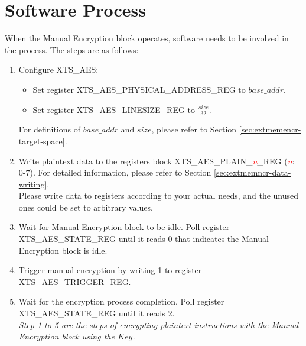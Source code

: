 \documentclass[main\_\_EN.tex]{subfiles}
\begin{document}
\section{ Software Process }

When the Manual Encryption block operates, software needs to be involved in the process. The steps are as follows:

\begin{enumerate}
    
    \item Configure XTS\_AES:
    \begin{itemize}
        \item Set register XTS\_AES\_PHYSICAL\_ADDRESS\_REG to \begin{math}base\_addr\end{math}.
        \item Set register XTS\_AES\_LINESIZE\_REG to \begin{math}\frac{size}{32}\end{math}.
    \end{itemize}
    For definitions of \begin{math} base\_addr\end{math} and \begin{math}size\end{math}, please refer to Section \ref{sec:extmemencr-target-space}.
    \item Write plaintext data to the registers block XTS\_AES\_PLAIN\_\textcolor{red}{\it{n}}\_REG (\textcolor{red}{\it{n}}: 0-7). For detailed information, please refer to Section \ref{sec:extmemncr-data-writing}. \\Please write data to registers according to your actual needs, and the unused ones could be set to arbitrary values.
    
    \item Wait for Manual Encryption block to be idle. Poll register XTS\_AES\_STATE\_REG until it reads 0 that indicates the Manual Encryption block is idle.
    
    \item Trigger manual encryption by writing 1 to register XTS\_AES\_TRIGGER\_REG.
    
    \item Wait for the encryption process completion. Poll register XTS\_AES\_STATE\_REG until it reads 2. \\ \textit{Step 1 to 5 are the steps of encrypting plaintext instructions with the Manual Encryption block using the \begin{math}Key\end{math}.}
    

\end{enumerate}
\end{document}
